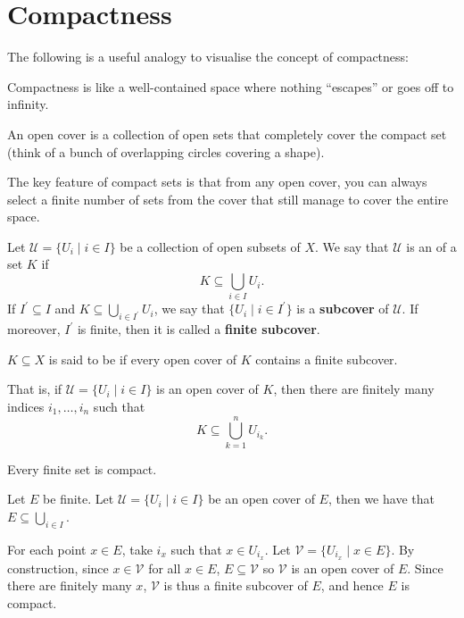\section{Compactness}
The following is a useful analogy to visualise the concept of compactness:
\begin{mdframed}
Compactness is like a well-contained space where nothing ``escapes'' or goes off to infinity.

An open cover is a collection of open sets that completely cover the compact set (think of a bunch of overlapping circles covering a shape).

The key feature of compact sets is that from any open cover, you can always select a finite number of sets from the cover that still manage to cover the entire space.
\end{mdframed}

\begin{definition}
Let $\mathcal{U}=\{U_i\mid i\in I\}$ be a collection of open subsets of $X$. We say that $\mathcal{U}$ is an  of a set $K$ if
\[K\subseteq\bigcup_{i\in I}U_i.\]
If $I^\prime\subseteq I$ and $K\subseteq\bigcup_{i\in I^\prime}U_i$, we say that $\{U_i\mid i\in I^\prime\}$ is a \textbf{subcover} of $\mathcal{U}$. If moreover, $I^\prime$ is finite, then it is called a \textbf{finite subcover}.
\end{definition}

\begin{definition}[Compactness]
$K\subseteq X$ is said to be  if every open cover of $K$ contains a finite subcover.
\end{definition}

That is, if $\mathcal{U}=\{U_i\mid i\in I\}$ is an open cover of $K$, then there are finitely many indices $i_1,\dots,i_n$ such that
\[K\subseteq \bigcup_{k=1}^{n}U_{i_k}.\]

\begin{exercise}
Every finite set is compact.
\end{exercise}

\begin{solution}
Let $E$ be finite. Let $\mathcal{U}=\{U_i\mid i\in I\}$ be an open cover of $E$, then we have that $E\subseteq\bigcup_{i\in I}$.

For each point $x\in E$, take $i_x$ such that $x\in U_{i_x}$. Let $\mathcal{V}=\{U_{i_x}\mid x\in E\}$. By construction, since $x\in\mathcal{V}$ for all $x\in E$, $E\subseteq\mathcal{V}$ so $\mathcal{V}$ is an open cover of $E$. Since there are finitely many $x$, $\mathcal{V}$ is thus a finite subcover of $E$, and hence $E$ is compact.
\end{solution}

